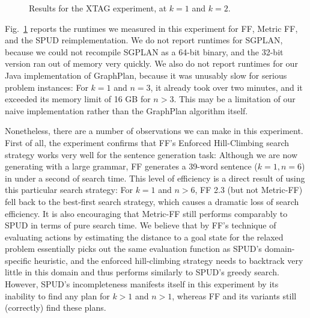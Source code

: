 \begin{figure}[t]
  \caption{Results for the XTAG experiment, at $k=1$ and $k=2$.}
  \label{fig:xtag-graph}
\end{figure}

Fig.~\ref{fig:xtag-graph} reports the runtimes we measured in this
experiment for FF, Metric FF, and the SPUD reimplementation. We do not
report runtimes for SGPLAN, because we could not recompile SGPLAN as a
64-bit binary, and the 32-bit version ran out of memory very
quickly. We also do not report runtimes for our Java implementation of
GraphPlan, because it was unusably slow for serious problem
instances: For $k=1$ and $n=3$, it already took over two minutes, and
it exceeded its memory limit of 16 GB for $n>3$. This may be a
limitation of our naive implementation rather than the GraphPlan
algorithm itself.

Nonetheless, there are a number of observations we can make in this
experiment. First of all, the experiment confirms that FF's Enforced
Hill-Climbing search strategy works very well for the sentence
generation task: Although we are now generating with a large grammar,
FF generates a 39-word sentence ($k=1,n=6$) in under a second of
search time. This level of efficiency is a direct result of using this
particular search strategy: For $k=1$ and $n>6$, FF 2.3 (but not
Metric-FF) fell back to the best-first search strategy, which causes a
dramatic loss of search efficiency. It is also encouraging that
Metric-FF still performs comparably to SPUD in terms of pure search
time. We believe that by FF's technique of evaluating actions by
estimating the distance to a goal state for the relaxed problem
essentially picks out the same evaluation function as SPUD's domain-specific
heuristic, and the enforced hill-climbing strategy needs to backtrack
very little in this domain and thus performs similarly to SPUD's
greedy search. However, SPUD's incompleteness manifests itself in this
experiment by its inability to find any plan for $k>1$ and $n>1$,
whereas FF and its variants still (correctly) find these plans.

